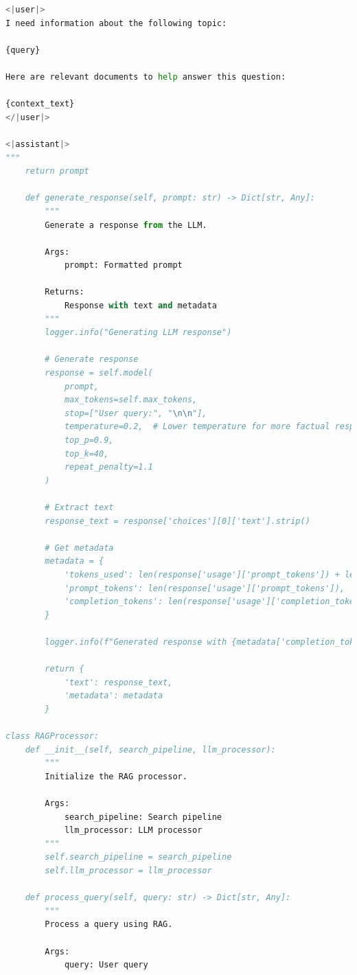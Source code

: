 \documentclass[
  screen,review,acmlarge]{acmart}
\begin{document}
\begin{lstlisting}[language=Python]
<|user|>
I need information about the following topic:

{query}

Here are relevant documents to help answer this question:

{context_text}
</|user|>

<|assistant|>
"""
    return prompt
        
    def generate_response(self, prompt: str) -> Dict[str, Any]:
        """
        Generate a response from the LLM.
        
        Args:
            prompt: Formatted prompt
            
        Returns:
            Response with text and metadata
        """
        logger.info("Generating LLM response")
        
        # Generate response
        response = self.model(
            prompt,
            max_tokens=self.max_tokens,
            stop=["User query:", "\n\n"],
            temperature=0.2,  # Lower temperature for more factual responses
            top_p=0.9,
            top_k=40,
            repeat_penalty=1.1
        )
        
        # Extract text
        response_text = response['choices'][0]['text'].strip()
        
        # Get metadata
        metadata = {
            'tokens_used': len(response['usage']['prompt_tokens']) + len(response['usage']['completion_tokens']),
            'prompt_tokens': len(response['usage']['prompt_tokens']),
            'completion_tokens': len(response['usage']['completion_tokens']),
        }
        
        logger.info(f"Generated response with {metadata['completion_tokens']} tokens")
        
        return {
            'text': response_text,
            'metadata': metadata
        }

class RAGProcessor:
    def __init__(self, search_pipeline, llm_processor):
        """
        Initialize the RAG processor.
        
        Args:
            search_pipeline: Search pipeline
            llm_processor: LLM processor
        """
        self.search_pipeline = search_pipeline
        self.llm_processor = llm_processor
    
    def process_query(self, query: str) -> Dict[str, Any]:
        """
        Process a query using RAG.
        
        Args:
            query: User query
            

\end{lstlisting}
\end{document}
